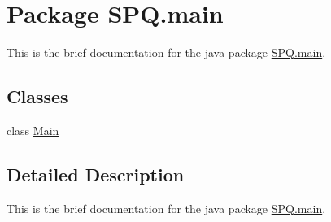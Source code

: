 \hypertarget{namespace_s_p_q_1_1main}{}\section{Package S\+P\+Q.\+main}
\label{namespace_s_p_q_1_1main}


This is the brief documentation for the java package \mbox{\hyperlink{namespace_s_p_q_1_1main}{S\+P\+Q.\+main}}.  


\subsection*{Classes}
\begin{DoxyCompactItemize}
\item 
class \mbox{\hyperlink{class_s_p_q_1_1main_1_1_main}{Main}}
\end{DoxyCompactItemize}


\subsection{Detailed Description}
This is the brief documentation for the java package \mbox{\hyperlink{namespace_s_p_q_1_1main}{S\+P\+Q.\+main}}. 
